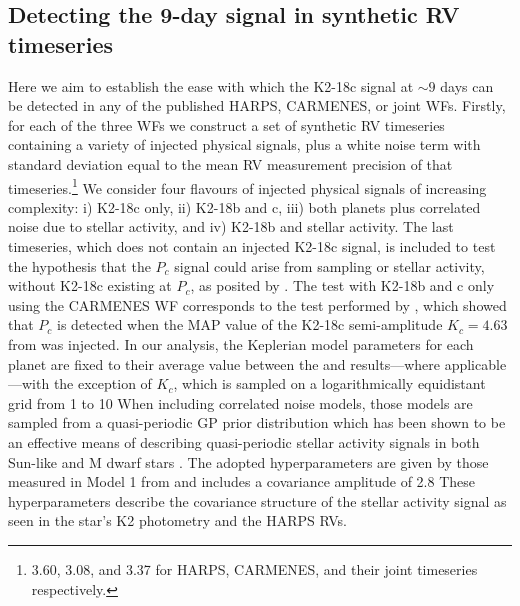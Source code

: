 \subsection{Detecting the 9-day signal in synthetic RV timeseries}
Here we aim to establish the ease with which the
K2-18c signal at $\sim 9$ days can be detected in any of the published HARPS,
CARMENES, or joint WFs. Firstly, for each of the three WFs we construct a set of synthetic RV
timeseries containing a variety of injected physical signals,
plus a white noise term with standard deviation equal to the mean
RV measurement precision of that timeseries.\footnote{ 3.60, 3.08, and 3.37 \mps{} for HARPS, CARMENES, and
  their joint timeseries respectively.} We consider four flavours of injected physical signals of increasing
complexity: i) K2-18c only, ii) K2-18b and c, iii) both planets plus correlated noise
due to stellar activity, and iv) K2-18b and stellar activity. The last timeseries, which does not contain an injected
K2-18c signal, is included to test the hypothesis that the $P_c$ signal could arise from sampling or stellar activity,
without K2-18c existing at $P_c$, as posited by .
The test with K2-18b and c only using the CARMENES WF corresponds
to the test performed by , which showed that $P_c$ is detected 
when the MAP value of the K2-18c semi-amplitude $K_c=4.63$ \mps{} from  was injected.
In our analysis, the Keplerian model parameters
for each planet are fixed to their average value between the  and 
results---where applicable---with the exception of $K_c$, which is sampled on a
logarithmically equidistant grid from 1 to 10  When including correlated noise models,
those models are sampled from a quasi-periodic GP prior distribution which has been shown to be
an effective means of describing quasi-periodic stellar activity signals in both Sun-like and M dwarf stars
\citep[e.g.][]{haywood14,cloutier17a}. The adopted hyperparameters are given by those measured in Model 1 from
 and includes a covariance amplitude of 2.8  These
hyperparameters describe the covariance structure of the stellar activity signal as seen in the star's K2 photometry
and the HARPS RVs.

